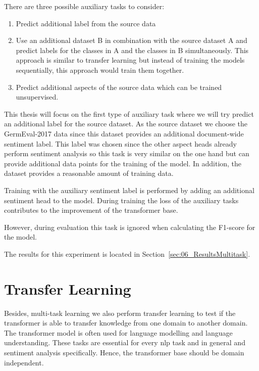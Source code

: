 There are three possible auxiliary tasks to consider:


\begin{enumerate}
	\item Predict additional label from the source data
	\item Use an additional dataset B in combination with the source dataset A and predict labels for the classes in A and the classes in B simultaneously. This approach is similar to transfer learning but instead of training the models sequentially, this approach would train them together.
	\item Predict additional aspects of the source data which can be trained unsupervised.
\end{enumerate}

This thesis will focus on the first type of auxiliary task where we will try predict an additional label for the source dataset. As the source dataset we choose the GermEval-2017 data since this dataset provides an additional document-wide sentiment label. This label was chosen since the other aspect heads already perform sentiment analysis so this task is very similar on the one hand but can provide additional data points for the training of the model. In addition, the dataset provides a reasonable amount of training data.

Training with the auxiliary sentiment label is performed by adding an additional sentiment head to the model. During training the loss of the auxiliary tasks contributes to the improvement of the transformer base.

However, during evaluation this task is ignored when calculating the F1-score for the model.
\medskip

The results for this experiment is located in Section~\ref{sec:06_ResultsMultitask}.



\section{Transfer Learning}
\label{sec:04_transferLearning}

Besides, multi-task learning we also perform transfer learning to test if the transformer is able to transfer knowledge from one domain to another domain. The transformer model is often used for language modelling and language understanding. These tasks are essential for every \gls{nlp} task and in general and sentiment analysis specifically. Hence, the transformer base should be domain independent. 
\medskip

